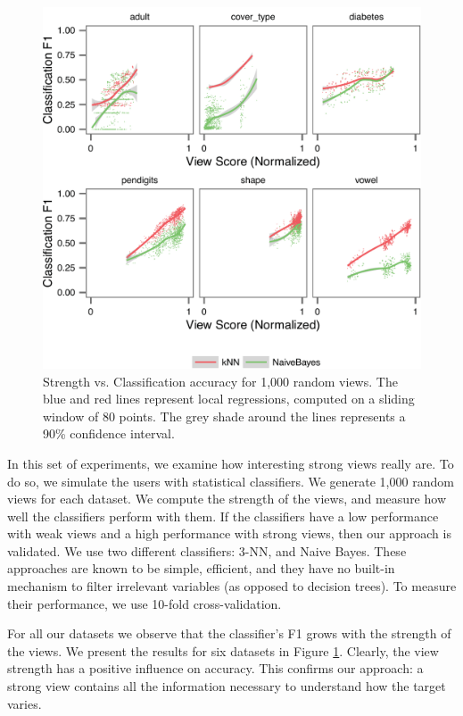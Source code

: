 \begin{figure}[t!]
\centering
\includegraphics[width=\columnwidth]{plots/compare-strength-f1}
\caption{Strength vs. Classification accuracy for 1,000 random views. The blue
    and red lines represent local regressions, computed on a sliding window of
    80 points. The grey shade around the lines represents a 90\% confidence
interval.}
\label{pic:strength-vs-f1}
\end{figure}

In this set of experiments, we examine how interesting strong views really are.
To do so, we simulate the users with statistical classifiers.  We generate
1,000 random views for each dataset. We compute the strength of the views, and
measure how well the classifiers perform with them. If the classifiers have a
low performance with weak views and a high performance with strong views, then
our approach is validated. We use two different classifiers: 3-NN, and Naive
Bayes.  These approaches are known to be simple, efficient, and they have no
built-in mechanism to filter irrelevant variables (as opposed to decision
trees). To measure their performance, we use 10-fold cross-validation.

For all our datasets we observe that the classifier's F1 grows with the
strength of the views. We present the results for six datasets in Figure
\ref{pic:strength-vs-f1}. Clearly, the view strength has a positive influence
on accuracy. This confirms our approach: a strong view contains all the
information necessary to understand how the target varies. 


